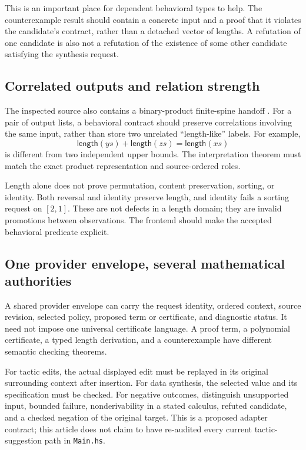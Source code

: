 \documentclass[11pt,a4paper]{article}
\newcommand{\code}[1]{\nolinkurl{#1}}
\newcommand{\length}{\mathsf{length}}
\theoremstyle{plain}
\theoremstyle{definition}
\theoremstyle{remark}
\begin{document}
This is an important place for dependent behavioral types to help. The
counterexample result should contain a concrete input and a proof that it
violates the candidate's contract, rather than a detached vector of lengths.
A refutation of one candidate is also not a refutation of the existence of
some other candidate satisfying the synthesis request.

\subsection{Correlated outputs and relation strength}
The inspected source also contains a binary-product finite-spine handoff
\cite{leanthandoff,leantcontract}. For a pair of output lists, a behavioral
contract should preserve correlations involving the same input, rather than
store two unrelated ``length-like'' labels. For example,
\[
 \length(ys)+\length(zs)=\length(xs)
\]
is different from two independent upper bounds. The interpretation theorem
must match the exact product representation and source-ordered roles.

Length alone does not prove permutation, content preservation, sorting, or
identity. Both reversal and identity preserve length, and identity fails a
sorting request on $[2,1]$. These are not defects in a length domain; they are
invalid promotions between observations. The frontend should make the
accepted behavioral predicate explicit.

\subsection{One provider envelope, several mathematical authorities}
A shared provider envelope can carry the request identity, ordered context,
source revision, selected policy, proposed term or certificate, and diagnostic
status. It need not impose one universal certificate language. A proof term,
a polynomial certificate, a typed length derivation, and a counterexample
have different semantic checking theorems.

For tactic edits, the actual displayed edit must be replayed in its original
surrounding context after insertion. For data synthesis, the selected value
and its specification must be checked. For negative outcomes, distinguish
unsupported input, bounded failure, nonderivability in a stated calculus,
refuted candidate, and a checked negation of the original target. This is a
proposed adapter contract; this article does not claim to have re-audited every
current tactic-suggestion path in \code{Main.hs}.
\end{document}
